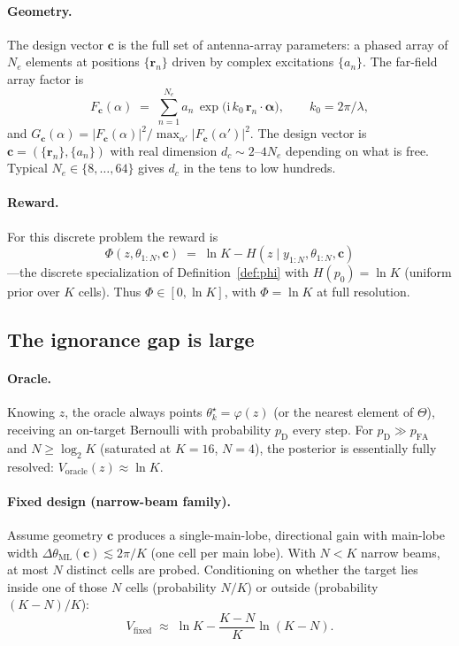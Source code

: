\documentclass[11pt,a4paper]{article}
\begin{document}
\paragraph{Geometry.}  The design vector $\bm{c}$ is the full set of antenna-array parameters: a phased array of $N_e$ elements at positions $\{\bm{r}_n\}$ driven by complex excitations $\{a_n\}$.  The far-field array factor is
\begin{equation}
  F_{\bm{c}}(\alpha) \;=\; \sum_{n=1}^{N_e} a_n \,\exp\!\bigl(\mathrm{i}\, k_0\, \bm{r}_n \cdot \hat{\bm{\alpha}}\bigr), \qquad k_0 = 2\pi/\lambda,
  \label{eq:array_factor}
\end{equation}
and $G_{\bm{c}}(\alpha) = |F_{\bm{c}}(\alpha)|^2 / \max_{\alpha'}|F_{\bm{c}}(\alpha')|^2$.  The design vector is $\bm{c} = (\{\bm{r}_n\}, \{a_n\})$ with real dimension $d_c \sim 2$--$4 N_e$ depending on what is free.  Typical $N_e \in \{8, \ldots, 64\}$ gives $d_c$ in the tens to low hundreds.

\paragraph{Reward.}  For this discrete problem the reward is
\begin{equation}
  \Phi(z, \theta_{1:N}, \bm{c}) \;=\; \ln K - H(z \mid y_{1:N}, \theta_{1:N}, \bm{c})
\end{equation}
---the discrete specialization of Definition~\ref{def:phi} with $H(p_0) = \ln K$ (uniform prior over $K$ cells).  Thus $\Phi \in [0, \ln K]$, with $\Phi = \ln K$ at full resolution.

\subsection{The ignorance gap is large}

\paragraph{Oracle.}  Knowing $z$, the oracle always points $\theta_k^\star = \varphi(z)$ (or the nearest element of $\Theta$), receiving an on-target Bernoulli with probability $p_{\mathrm{D}}$ every step.  For $p_{\mathrm{D}} \gg p_{\mathrm{FA}}$ and $N \ge \log_2 K$ (saturated at $K = 16$, $N = 4$), the posterior is essentially fully resolved: $V_{\mathrm{oracle}}(z) \approx \ln K$.

\paragraph{Fixed design (narrow-beam family).}  Assume geometry $\bm{c}$ produces a single-main-lobe, directional gain with main-lobe width $\Delta\theta_{\mathrm{ML}}(\bm{c}) \lesssim 2\pi/K$ (one cell per main lobe).  With $N < K$ narrow beams, at most $N$ distinct cells are probed.  Conditioning on whether the target lies inside one of those $N$ cells (probability $N/K$) or outside (probability $(K-N)/K$):
\begin{equation}
  V_{\mathrm{fixed}} \;\approx\; \ln K - \frac{K - N}{K}\ln(K - N).
  \label{eq:radar_vfixed}
\end{equation}
\end{document}
